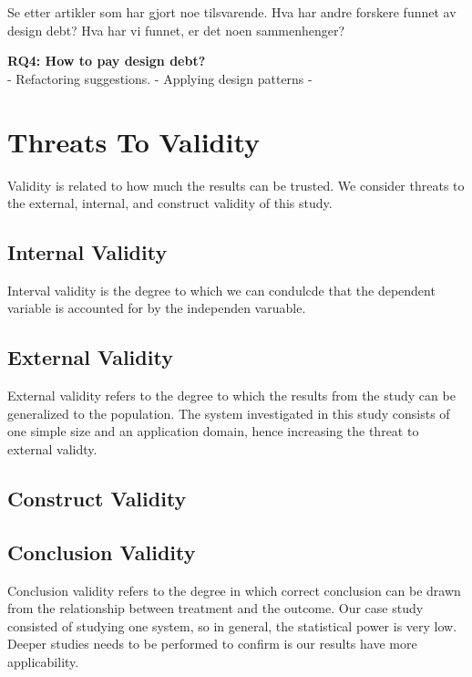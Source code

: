 Se etter artikler som har gjort noe tilsvarende. Hva har andre forskere funnet av design debt? Hva har vi funnet, er det noen sammenhenger?

\textbf{RQ4: How to pay design debt?} \\
- Refactoring suggestions.
- Applying design patterns
-





\section{Threats To Validity}
\label{sub:threats_to_validity}
Validity is related to how much the results can be trusted\cite{Wohlin:2000:ESE:330775}. We consider threats to the external, internal, and construct validity of this study.

\subsection{Internal Validity}
\label{sub:internal_validty}
Interval validity is the degree to which we can condulcde that the dependent variable is accounted for by the independen varuable.

\subsection{External Validity}
\label{sub:external_validity}
External validity refers to the degree to which the results from the study can be generalized to the population. The system investigated in this study consists of one simple size and an application domain, hence increasing the threat to external validty. 

\subsection{Construct Validity} %
\label{sub:construct_validity}

\subsection{Conclusion Validity} %
\label{sub:conclusion_validity}
Conclusion validity refers to the degree in which correct conclusion can be drawn from the relationship between treatment and the outcome. Our case study consisted of studying one system, so in general, the statistical power is very low. Deeper studies needs to be performed to confirm is our results have more applicability.










